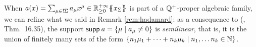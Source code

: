  	\begin{remark}
 	\label{remark:semilinear}
	
	
	
%	
		When $a(x) =  \sum_{\mu \in !\Sigma} a_\mu x^\mu \in {\mathbb{R}^{+\infty}_{\geq 0}}\{\!\!\{x_\Sigma\}\!\!\}$ is part of a $\mathbb{Q}^+$-proper algebraic family, we can refine what we said in Remark \ref{rem:hadamard}: as a consequence to (\cite{DBLP:books/sp/KuichS86}, Thm.~16.35), the support 
 		$\mathsf{supp} \: a=\{\mu \mid a_\mu \neq 0\} $
 		is \emph{semilinear}, that is, it is
%		
		the union of finitely many sets of the form $\{n_1 \mu_1 + \dots + n_k \mu _k  \mid n_1, \dots n_k \in \mathbb{N} \}$.
 	\end{remark}
